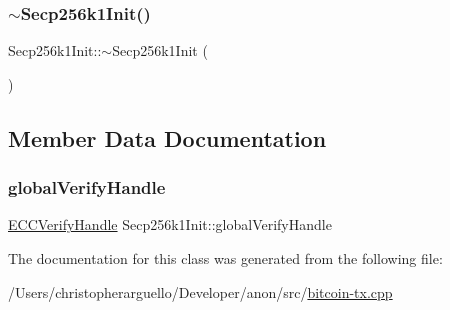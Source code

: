 \subsubsection{\texorpdfstring{$\sim$\+Secp256k1\+Init()}{~Secp256k1Init()}}
{\footnotesize\ttfamily Secp256k1\+Init\+::$\sim$\+Secp256k1\+Init (\begin{DoxyParamCaption}{ }\end{DoxyParamCaption})\hspace{0.3cm}{\ttfamily [inline]}}



\subsection{Member Data Documentation}
\mbox{\label{class_secp256k1_init_aff0f2f148a87cd9149ed587d8ee46cf5}} 
\subsubsection{\texorpdfstring{global\+Verify\+Handle}{globalVerifyHandle}}
{\footnotesize\ttfamily \mbox{\hyperlink{class_e_c_c_verify_handle}{E\+C\+C\+Verify\+Handle}} Secp256k1\+Init\+::global\+Verify\+Handle\hspace{0.3cm}{\ttfamily [private]}}



The documentation for this class was generated from the following file\+:\begin{DoxyCompactItemize}
\item 
/\+Users/christopherarguello/\+Developer/anon/src/\mbox{\hyperlink{bitcoin-tx_8cpp}{bitcoin-\/tx.\+cpp}}\end{DoxyCompactItemize}
